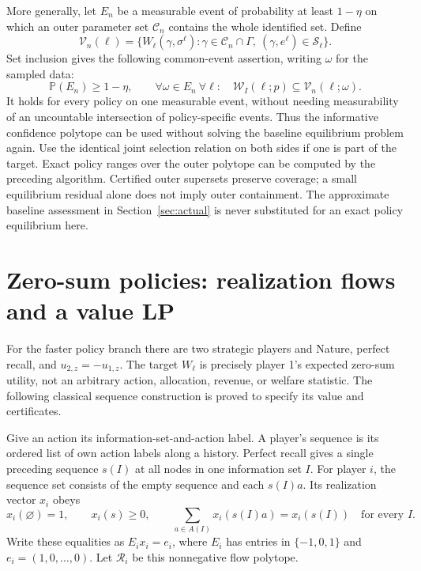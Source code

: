 \documentclass[11pt,a4paper]{article}
\numberwithin{equation}{section}
\theoremstyle{definition}
\newcommand{\Prob}{\mathbb P}
\begin{document}
More generally, let \(E_n\) be a measurable event of probability at
least \(1-\eta\) on which an outer parameter set \(\mathcal C_n\)
contains the whole identified set. Define
\[
 \mathcal V_n(\ell)=
 \{W_\ell(\gamma,\sigma^\ell):
          \gamma\in\mathcal C_n\cap\Gamma,\
          (\gamma,e^\ell)\in\mathcal S_\ell\}.
\]
Set inclusion gives the following common-event assertion, writing
\(\omega\) for the sampled data:
\begin{equation}\label{eq:S23}
 \Prob(E_n)\ge1-\eta,\qquad
 \forall\omega\in E_n\ \forall\ell:\quad
 \mathcal W_I(\ell;p)\subseteq\mathcal V_n(\ell;\omega).
\end{equation}
It holds for every policy on one measurable event, without needing
measurability of an uncountable intersection of policy-specific events.
Thus the informative confidence polytope can be used without solving
the baseline equilibrium problem again.
Use the identical joint selection relation on both sides if one is
part of the target. Exact policy ranges over the outer polytope can
be computed by the preceding algorithm.
Certified outer supersets preserve coverage; a small equilibrium
residual alone does not imply outer containment.
The approximate baseline assessment in Section~\ref{sec:actual}
is never substituted for an exact policy equilibrium here.

\section{Zero-sum policies: realization flows and a value LP}
\label{sec:sequences}
For the faster policy branch there are two strategic players and
Nature, perfect recall, and \(u_{2,z}=-u_{1,z}\).
The target \(W_\ell\) is precisely player 1's expected zero-sum
utility, not an arbitrary action, allocation, revenue, or welfare
statistic. The following classical sequence construction
\cite[Section~2, pp.~249--250]{KMS} is proved to specify its value
and certificates.

Give an action its information-set-and-action label.
A player's sequence is its ordered list of own action labels along
a history. Perfect recall gives a single preceding sequence \(s(I)\)
at all nodes in one information set \(I\). For player \(i\), the
sequence set consists of the empty sequence and each \(s(I)a\).
Its realization vector \(x_i\) obeys
\begin{equation}\label{eq:sequenceflow}
 x_i(\varnothing)=1,\qquad x_i(s)\ge0,\qquad
 \sum_{a\in A(I)}x_i(s(I)a)=x_i(s(I))\quad\text{for every }I .
\end{equation}
Write these equalities as \(E_ix_i=e_i\), where \(E_i\) has
entries in \(\{-1,0,1\}\) and \(e_i=(1,0,\ldots,0)\).
Let \(\mathcal R_i\) be this nonnegative flow polytope.
\end{document}
